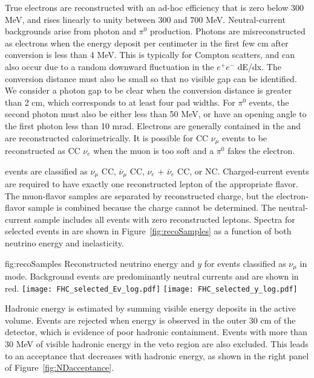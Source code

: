 True electrons are reconstructed with an ad-hoc efficiency that is zero below 300 MeV, and rises linearly to unity between 300 and 700 MeV. Neutral-current backgrounds arise from photon and $\pi^{0}$ production. Photons are misreconstructed as electrons when the energy deposit per centimeter in the first few cm after conversion is less than 4 MeV. This is typically for Compton scatters, and can also occur due to a random downward fluctuation in the $e^{+}e^{-}$ dE/dx. The conversion distance must also be small so that no visible gap can be identified. We consider a photon gap to be clear when the conversion distance is greater than 2 cm, which corresponds to at least four pad widths. For $\pi^{0}$ events, the second photon must also be either less than 50 MeV, or have an opening angle to the first photon less than 10 mrad. Electrons are generally contained in the  and are reconstructed calorimetrically. It is possible for CC $\nu_{\mu}$ events to be reconstructed as CC $\nu_{e}$ when the muon is too soft and a $\pi^{0}$ fakes the electron.

 events are classified as $\nu_{\mu}$ CC, $\bar{\nu}_{\mu}$ CC, $\nu_{e}$ + $\bar{\nu}_{e}$ CC, or NC. Charged-current events are required to have exactly one reconstructed lepton of the appropriate flavor. The muon-flavor samples are separated by reconstructed charge, but the electron-flavor sample is combined because the charge cannot be determined. The neutral-current sample includes all events with zero reconstructed leptons. Spectra for selected \numu {} events in  are shown in Figure~\ref{fig:recoSamples} as a function of both neutrino energy and inelasticity.

\begin{dunefigure}{fig:recoSamples}
{Reconstructed neutrino energy and $y$ for events classified as $\nu_{\mu}$  in  mode. Background events are predominantly neutral currents and are shown in red.}
 \texttt{[image: FHC\_selected\_Ev\_log.pdf]}
 \texttt{[image: FHC\_selected\_y\_log.pdf]}
\end{dunefigure}

Hadronic energy is estimated by summing visible energy deposits in the active  volume. Events are rejected when energy is observed in the outer 30 cm of the detector, which is evidence of poor hadronic containment.  Events with more than 30 MeV of visible hadronic energy in the veto region are also excluded.  This leads to an acceptance that decreases with hadronic energy, as shown in the right panel of Figure~\ref{fig:NDacceptance}.

